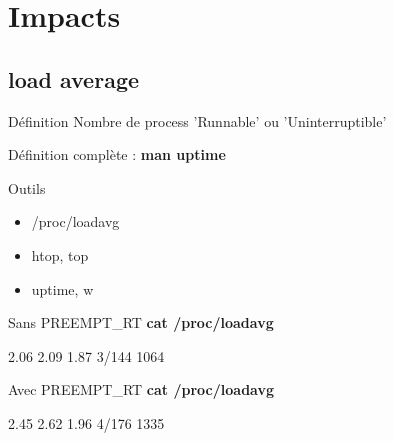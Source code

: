 \section{Impacts}
\subsection{load average}
\begin{frame}
	\begin{block}{Définition}
Nombre de process 'Runnable' ou 'Uninterruptible'

Définition complète : \textbf{man uptime}
	\end{block}
	\begin{block}{Outils}
		\begin{itemize}
			\item /proc/loadavg
			\item htop, top
			\item uptime, w
		\end{itemize}
	\end{block}
\end{frame}
\begin{frame}
	\begin{block}{Sans PREEMPT\_RT}
\textbf{cat /proc/loadavg}

2.06 2.09 1.87 3/144 1064
	\end{block}
	\begin{block}{Avec PREEMPT\_RT}
\textbf{cat /proc/loadavg}

2.45 2.62 1.96 4/176 1335
	\end{block}
\end{frame}
\begin{frame}
\end{frame}
\begin{frame}
\end{frame}
